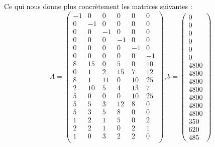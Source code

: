 Ce qui nous donne plus concrètement les matrices suivantes :
\[
A =
\begin{pmatrix}
   -1 &    0 &    0 &    0 &    0 &    0 \\
    0 &   -1 &    0 &    0 &    0 &    0 \\
    0 &    0 &   -1 &    0 &    0 &    0 \\
    0 &    0 &    0 &   -1 &    0 &    0 \\
    0 &    0 &    0 &    0 &   -1 &    0 \\
    0 &    0 &    0 &    0 &    0 &   -1 \\
\hline
    8 &   15 &    0 &    5 &    0 &   10 \\
    0 &    1 &    2 &   15 &    7 &   12 \\
    8 &    1 &   11 &    0 &   10 &   25 \\
    2 &   10 &    5 &    4 &   13 &    7 \\
    5 &    0 &    0 &    0 &   10 &   25 \\
    5 &    5 &    3 &   12 &    8 &    0 \\
    5 &    3 &    5 &    8 &    0 &    0 \\
\hline
    1 &    2 &    1 &    5 &    0 &    2 \\
    2 &    2 &    1 &    0 &    2 &    1 \\
    1 &    0 &    3 &    2 &    2 &    0 \\
\end{pmatrix}
, b = 
\begin{pmatrix}
0 \\ 0 \\ 0 \\ 0 \\ 0 \\ 0 \\
\hline
4800 \\ 4800 \\ 4800 \\ 4800 \\ 4800 \\ 4800 \\ 4800 \\
\hline
350 \\ 620 \\ 485
\end{pmatrix}
\]







